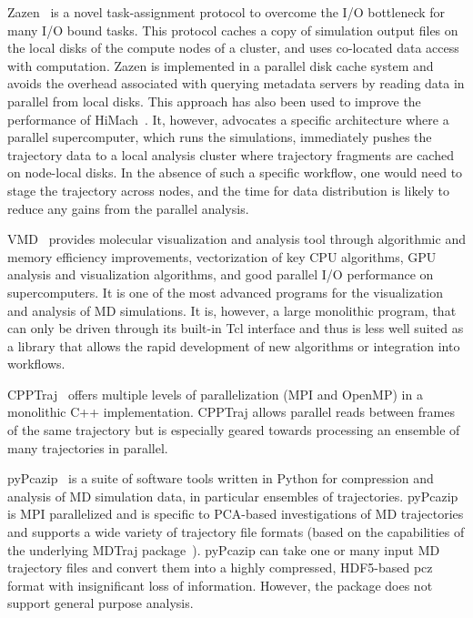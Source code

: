 Zazen~\cite{Zazen} is a novel task-assignment protocol to overcome the I/O bottleneck for many I/O bound tasks. This protocol caches a copy of simulation output files on the local disks of the compute nodes of a cluster, and uses co-located data access with computation. 
Zazen is implemented in a parallel disk cache system and avoids the overhead associated with querying metadata servers by reading data in parallel from local disks.
This approach has also been used to improve the performance of HiMach~\cite{himach-2008}.
It, however, advocates a specific architecture where a parallel supercomputer, which runs the simulations, immediately pushes the trajectory data to a local analysis cluster where trajectory fragments are cached on node-local disks.
In the absence of such a specific  workflow, one would need to stage the trajectory across nodes, and the time for data distribution is likely to reduce any gains from the parallel analysis.

VMD~\cite{Hum96, VMD2013} provides molecular visualization and analysis tool through algorithmic and memory efficiency improvements, vectorization of key CPU algorithms, GPU analysis and visualization algorithms, and good parallel I/O performance on supercomputers. It is one of the most advanced programs for the visualization and analysis of MD simulations. It is, however, a large monolithic program, that can only be driven through its built-in Tcl interface and thus is less well suited as a library that allows the rapid development of new algorithms or integration into workflows.

CPPTraj~\cite{cpptraj-2013} offers multiple levels of parallelization (MPI and OpenMP) in a monolithic C++ implementation.
CPPTraj allows parallel reads between frames of the same trajectory but is especially geared towards processing an ensemble of many trajectories in parallel.

pyPcazip~\cite{pyPcazip} is a suite of software tools written in Python for compression and analysis of MD simulation data, in particular ensembles of trajectories. 
pyPcazip is MPI parallelized and is specific to PCA-based investigations of MD trajectories and supports a wide variety of trajectory file formats (based on the capabilities of the underlying MDTraj package~\cite{McGibbon:2015aa}).
pyPcazip can take one or many input MD trajectory files and convert them into a highly compressed, HDF5-based pcz format with insignificant loss of information.
However, the package does not support general purpose analysis.

